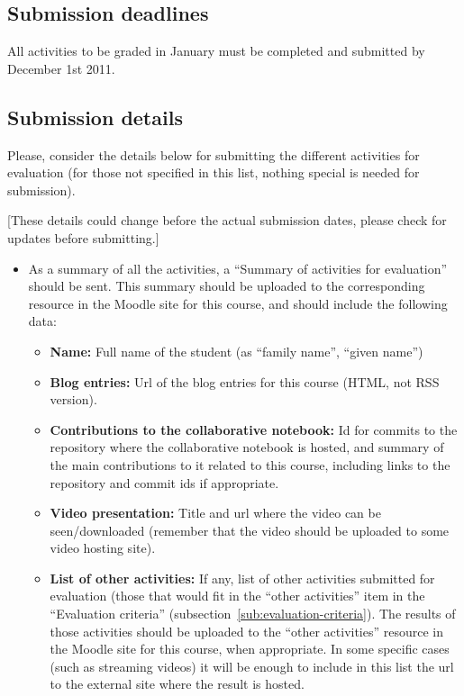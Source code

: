 \documentclass[a4paper]{article}
\begin{document}
\subsection{Submission deadlines}

All activities to be graded in January must be completed and submitted by December 1st 2011.

\subsection{Submission details}

Please, consider the details below for submitting the different activities for evaluation (for those not specified in this list, nothing special is needed for submission).

[These details could change before the actual submission dates, please check for updates before submitting.]

\begin{itemize}
\item As a summary of all the activities, a ``Summary of activities for evaluation'' should be sent. This summary should be uploaded to the corresponding resource in the Moodle site for this course, and should include the following data:
  \begin{itemize}
  \item \textbf{Name:} Full name of the student (as ``family name'', ``given name'')
  \item \textbf{Blog entries:} Url of the blog entries for this course (HTML, not RSS version).
  \item \textbf{Contributions to the collaborative notebook:} Id for commits to the repository where the collaborative notebook is hosted, and summary of the main contributions to it related to this course, including links to the repository and commit ids if appropriate.
  \item \textbf{Video presentation:} Title and url where the video can be seen/downloaded (remember that the video should be uploaded to some video hosting site).
  \item \textbf{List of other activities:} If any, list of other activities submitted for evaluation (those that would fit in the ``other activities'' item in the ``Evaluation criteria'' (subsection~\ref{sub:evaluation-criteria}). The results of those activities should be uploaded to the ``other activities'' resource in the Moodle site for this course, when appropriate. In some specific cases (such as streaming videos) it will be enough to include in this list the url to the external site where the result is hosted.
  \end{itemize}
\end{itemize}
\end{document}
